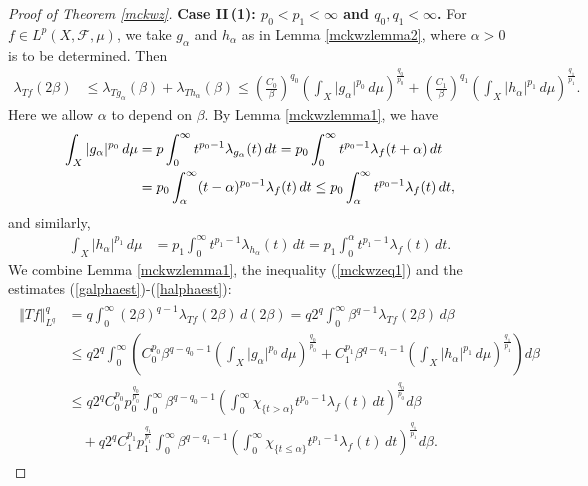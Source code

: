 \documentclass{article}
\numberwithin{equation}{section}
\newcommand{\scr}{\mathscr}
\theoremstyle{plain}
\theoremstyle{definition}
\begin{document}
\begin{proof}[Proof of Theorem \ref{mckwz}]
\item\textbf{Case II\,(1): $p_0<p_1<\infty$ and $q_0,q_1<\infty$.} 
For $f\in L^p(X,\scr{F},\mu)$, we take $g_\alpha$ and $h_\alpha$ as in Lemma \ref{mckwzlemma2}, where $\alpha>0$ is to be determined. Then
	\begin{align}
		\lambda_{Tf}(2\beta)&\leq \lambda_{Tg_\alpha}(\beta)+\lambda_{Th_\alpha}(\beta)\leq\left(\frac{C_0}{\beta}\right)^{q_0}\left(\int_X\vert g_\alpha\vert^{p_0}\,d\mu\right)^{\frac{q_0}{p_0}}+\left(\frac{C_1}{\beta}\right)^{q_1}\left(\int_X\vert h_\alpha\vert^{p_1}\,d\mu\right)^{\frac{q_1}{p_1}}.\label{mckwzeq1}
	\end{align}
	Here we allow $\alpha$ to depend on $\beta$. By Lemma \ref{mckwzlemma1}, we have
	\begin{align}
		\int_X\vert g_\alpha\vert^{p_0}\,d\mu&=p\int_0^\infty t^{p_0-1}\lambda_{g_\alpha}(t)\,dt=p_0\int_0^\infty t^{p_0-1}\lambda_f(t+\alpha)\,dt\notag\\
		&=p_0\int_\alpha^\infty(t-\alpha)^{p_0-1}\lambda_f(t)\,dt\leq p_0\int_\alpha^\infty t^{p_0-1}\lambda_f(t)\,dt,\label{galphaest}
	\end{align}
	and similarly, \vspace{-0.1cm}
	\begin{align}
		\int_X\vert h_\alpha\vert^{p_1}\,d\mu&=p_1\int_0^\infty t^{p_1-1}\lambda_{h_\alpha}(t)\,dt=p_1\int_0^\alpha t^{p_1-1}\lambda_f(t)\,dt.\label{halphaest}
	\end{align}
	We combine Lemma \ref{mckwzlemma1}, the inequality (\ref{mckwzeq1}) and the estimates (\ref{galphaest})-(\ref{halphaest}):
	\begin{align}
	\begin{aligned}
	\Vert Tf\Vert_{L^q}^q&=q\int_0^\infty (2\beta)^{q-1}\lambda_{Tf}(2\beta)\,d(2\beta)=q2^q\int_0^\infty \beta^{q-1}\lambda_{Tf}(2\beta)\,d\beta\\
	&\leq q2^q\int_0^\infty\left(C_0^{p_0}\beta^{q-q_0-1}\left(\int_X\vert g_\alpha\vert^{p_0}\,d\mu\right)^{\frac{q_0}{p_0}}+C_1^{p_1} \beta^{q-q_1-1}\left(\int_X\vert h_\alpha\vert^{p_1}\,d\mu\right)^{\frac{q_1}{p_1}}\right)d\beta\\
	&\leq q2^qC_0^{p_0}p_0^{\frac{q_0}{p_0}}\int_0^\infty\beta^{q-q_0-1}\left(\int_0^\infty\chi_{\{t>\alpha\}} t^{p_0-1}\lambda_f(t)\,dt\right)^{\frac{q_0}{p_0}}d\beta\\
	&\quad+q2^qC_1^{p_1}p_1^{\frac{q_1}{p_1}}\int_0^\infty\beta^{q-q_1-1}\left(\int_0^\infty\chi_{\{t\leq\alpha\}} t^{p_1-1}\lambda_f(t)\,dt\right)^{\frac{q_1}{p_1}}d\beta.
	\end{aligned}\label{mckwzest3}

\end{align}
\end{proof}
\end{document}
